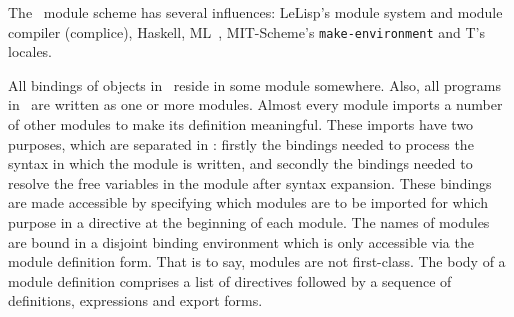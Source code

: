 %
\label{sec:modules}
%
\begin{optDefinition}
The \eulisp\ module scheme has several influences:
LeLisp's module system and module compiler (complice),
Haskell, ML~, MIT-Scheme's {\tt make-environment} and T's locales.

All bindings of objects in \eulisp\ reside in some module somewhere.  Also, all
programs in \eulisp\ are written as one or more modules.  Almost every module
imports a number of other modules to make its definition meaningful.  These
imports have two purposes, which are separated in \eulisp: firstly the bindings
needed to process the syntax in which the module is written, and secondly the
bindings needed to resolve the free variables in the module after syntax
expansion.  These bindings are made accessible by specifying which modules are
to be imported for which purpose in a directive at the beginning of each module.
The names of modules are bound in a disjoint binding
environment which is only accessible via the module definition form.  That
is to say, modules are not first-class.  The body of a module definition
comprises a list of directives followed by a sequence of definitions,
expressions and export forms.


\end{optDefinition}
